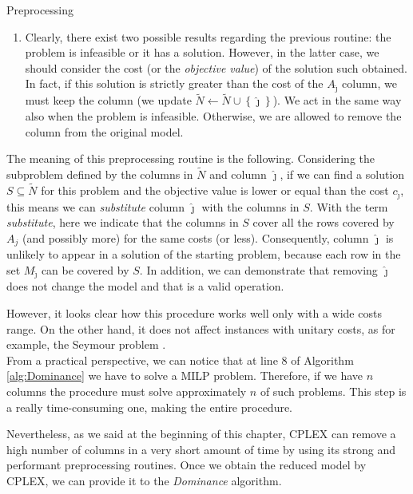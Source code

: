\documentclass[a4paper,12pt]{mydeitesi_eng}
\begin{document}
\begin{chapter}{Preprocessing}
\begin{enumerate}
\item Clearly, there exist two possible results regarding the previous routine: the problem is infeasible or it has a solution.
However, in the latter case, we should consider the cost (or the \emph{objective value}) of the solution such obtained.
In fact, if this solution is strictly greater than the cost of the $A_{\hat{\jmath}}$ column, we must keep the column (we update $\tilde{N} \gets \tilde{N} \cup \left\{\hat{\jmath}\right\}$).
We act in the same way also when the problem is infeasible.
Otherwise, we are allowed to remove the column from the original model.
\end{enumerate}

The meaning of this preprocessing routine is the following.
Considering the subproblem defined by the columns in $\tilde{N}$ and column $\hat{\jmath}$, if we can find a solution $S \subseteq \tilde{N}$ for this problem and the objective value is lower or equal than the cost $c_{\hat{\jmath}}$, this means we can \emph{substitute} column $\hat{\jmath}$ with the columns in $S$.
With the term \emph{substitute}, here we indicate that the columns in $S$ cover all the rows covered by $A_j$ (and possibly more) for the same costs (or less).
Consequently, column $\hat{\jmath}$ is unlikely to appear in a solution of the starting problem, because each row in the set $M_{\hat{\jmath}}$ can be covered by $S$.
In addition, we can demonstrate that removing $\hat{\jmath}$ does not change the model and that is a valid operation.

However, it looks clear how this procedure works well only with a wide costs range. On the other hand, it does not affect instances with unitary costs, as for example, the Seymour problem \cite{SolvingSeymour}.\\

From a practical perspective, we can notice that at line $8$ of Algorithm \ref{alg:Dominance} we have to solve a MILP problem.
Therefore, if we have $n$ columns the procedure must solve approximately $n$ of such problems.
This step is a really time-consuming one, making the entire procedure.

Nevertheless, as we said at the beginning of this chapter, CPLEX can remove a high number of columns in a very short amount of time by using its strong and performant preprocessing routines.
Once we obtain the reduced model by CPLEX, we can provide it to the \emph{Dominance} algorithm.\\



\end{chapter}
\end{document}
